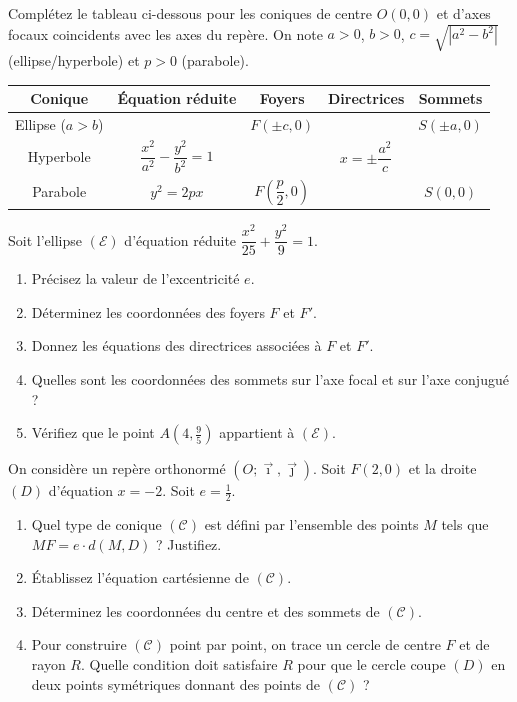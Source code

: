 \documentclass[11pt]{article}
\begin{document}
\begin{exercice}
Complétez le tableau ci-dessous pour les coniques de centre $O(0,0)$ et d'axes focaux coincidents avec les axes du repère. On note $a > 0$, $b > 0$, $c = \sqrt{|a^2 - b^2|}$ (ellipse/hyperbole) et $p > 0$ (parabole).

\begin{tabular}{|c|c|c|c|c|}
\hline
\textbf{Conique} & \textbf{Équation réduite} & \textbf{Foyers} & \textbf{Directrices} & \textbf{Sommets} \\
\hline
Ellipse ($a > b$) & & $F(\pm c, 0)$ & & $S(\pm a, 0)$ \\
\hline
Hyperbole & $\dfrac{x^2}{a^2} - \dfrac{y^2}{b^2} = 1$ & & $x = \pm \dfrac{a^2}{c}$ & \\
\hline
Parabole & $y^2 = 2px$ & $F\left(\dfrac{p}{2}, 0\right)$ & & $S(0,0)$ \\
\hline
\end{tabular}
\end{exercice}

\begin{exercice}
Soit l'ellipse $(\mathcal{E})$ d'équation réduite $\dfrac{x^2}{25} + \dfrac{y^2}{9} = 1$.
\begin{enumerate}
    \item Précisez la valeur de l'excentricité $e$.
    \item Déterminez les coordonnées des foyers $F$ et $F'$.
    \item Donnez les équations des directrices associées à $F$ et $F'$.
    \item Quelles sont les coordonnées des sommets sur l'axe focal et sur l'axe conjugué ?
    \item Vérifiez que le point $A(4, \frac{9}{5})$ appartient à $(\mathcal{E})$.
\end{enumerate}
\end{exercice}

\begin{exercice}
On considère un repère orthonormé $(O; \vec{\imath}, \vec{\jmath})$. Soit $F(2, 0)$ et la droite $(D)$ d'équation $x = -2$. Soit $e = \frac{1}{2}$.
\begin{enumerate}
    \item Quel type de conique $(\mathcal{C})$ est défini par l'ensemble des points $M$ tels que $MF = e \cdot d(M, D)$ ? Justifiez.
    \item Établissez l'équation cartésienne de $(\mathcal{C})$.
    \item Déterminez les coordonnées du centre et des sommets de $(\mathcal{C})$.
    \item Pour construire $(\mathcal{C})$ point par point, on trace un cercle de centre $F$ et de rayon $R$. Quelle condition doit satisfaire $R$ pour que le cercle coupe $(D)$ en deux points symétriques donnant des points de $(\mathcal{C})$ ?
\end{enumerate}
\end{exercice}
\end{document}
